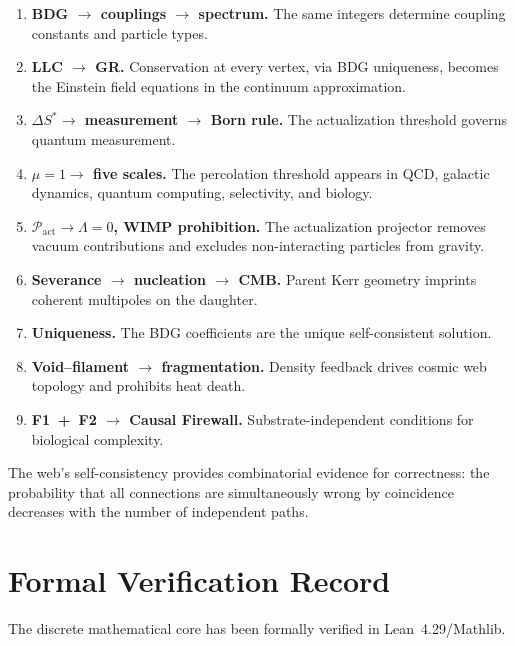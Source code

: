 \documentclass[11pt,a4paper]{article}
\theoremstyle{plain}
\theoremstyle{definition}
\theoremstyle{remark}
\newcommand{\Pact}{\mathcal{P}_{\mathrm{act}}}
\begin{document}
\begin{enumerate}[nosep,leftmargin=2em]
\item \textbf{BDG $\to$ couplings $\to$ spectrum.}
  The same integers determine coupling constants and particle types.
\item \textbf{LLC $\to$ GR.}
  Conservation at every vertex, via BDG uniqueness, becomes the Einstein
  field equations in the continuum approximation.
\item \textbf{$\Delta S^* \to$ measurement $\to$ Born rule.}
  The actualization threshold governs quantum measurement.
\item \textbf{$\mu = 1 \to$ five scales.}
  The percolation threshold appears in QCD, galactic dynamics, quantum
  computing, selectivity, and biology.
\item \textbf{$\Pact \to \Lambda = 0$, WIMP prohibition.}
  The actualization projector removes vacuum contributions and excludes
  non-interacting particles from gravity.
\item \textbf{Severance $\to$ nucleation $\to$ CMB.}
  Parent Kerr geometry imprints coherent multipoles on the daughter.
\item \textbf{Uniqueness.}
  The BDG coefficients are the unique self-consistent solution.
\item \textbf{Void--filament $\to$ fragmentation.}
  Density feedback drives cosmic web topology and prohibits heat death.
\item \textbf{F1~+~F2 $\to$ Causal Firewall.}
  Substrate-independent conditions for biological complexity.
\end{enumerate}

The web's self-consistency provides combinatorial evidence for
correctness: the probability that all connections are simultaneously wrong
by coincidence decreases with the number of independent paths.

\section{Formal Verification Record}\label{sec:lean}

The discrete mathematical core has been formally verified in
Lean~4.29/Mathlib.
\end{document}
